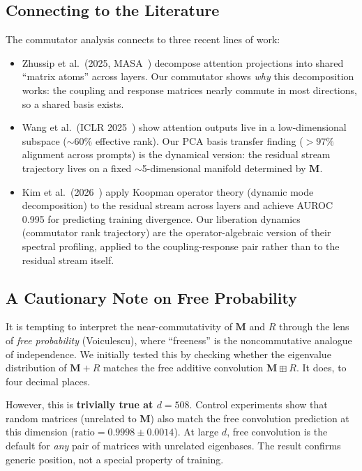 \documentclass[11pt, a4paper]{article}
\newcommand{\M}{\mathbf{M}}
\theoremstyle{remark}
\begin{document}
\subsection{Connecting to the Literature}

The commutator analysis connects to three recent lines of work:

\begin{itemize}[leftmargin=*]
\item Zhussip et al.\ (2025, MASA~\cite{masa2025}) decompose attention projections into shared ``matrix atoms'' across layers. Our commutator shows \emph{why} this decomposition works: the coupling and response matrices nearly commute in most directions, so a shared basis exists.

\item Wang et al.\ (ICLR 2025~\cite{wang2025lowdim}) show attention outputs live in a low-dimensional subspace ($\sim$60\% effective rank). Our PCA basis transfer finding ($>97\%$ alignment across prompts) is the dynamical version: the residual stream trajectory lives on a fixed $\sim$5-dimensional manifold determined by $\M$.

\item Kim et al.\ (2026~\cite{kim2026koopman}) apply Koopman operator theory (dynamic mode decomposition) to the residual stream across layers and achieve AUROC 0.995 for predicting training divergence. Our liberation dynamics (commutator rank trajectory) are the operator-algebraic version of their spectral profiling, applied to the coupling-response pair rather than to the residual stream itself.
\end{itemize}

\subsection{A Cautionary Note on Free Probability}

It is tempting to interpret the near-commutativity of $\M$ and $R$ through the lens of \emph{free probability} (Voiculescu), where ``freeness'' is the noncommutative analogue of independence.
We initially tested this by checking whether the eigenvalue distribution of $\M + R$ matches the free additive convolution $\M \boxplus R$.
It does, to four decimal places.

However, this is \textbf{trivially true at $d = 508$}.
Control experiments show that random matrices (unrelated to $\M$) also match the free convolution prediction at this dimension ($\text{ratio} = 0.9998 \pm 0.0014$).
At large $d$, free convolution is the default for \emph{any} pair of matrices with unrelated eigenbases.
The result confirms generic position, not a special property of training.
\end{document}
